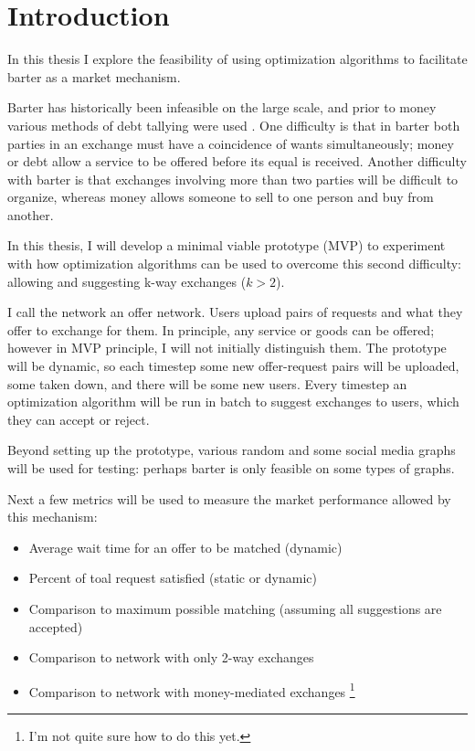\documentclass[main.tex]{subfiles}
\begin{document}
\section{Introduction}
In this thesis I explore the feasibility of using optimization algorithms to facilitate barter as a market mechanism.

Barter has historically been infeasible on the large scale, and prior to money various methods of debt tallying were used \cite{Gra1}. One difficulty is that in barter both parties in an exchange must have a coincidence of wants simultaneously; money or debt allow a service to be offered before its equal is received. Another difficulty with barter is that exchanges involving more than two parties will be difficult to organize, whereas money allows someone to sell to one person and buy from another.

In this thesis, I will develop a minimal viable prototype (MVP) to experiment with how optimization algorithms can be used to overcome this second difficulty: allowing and suggesting k-way exchanges ($k>2$).

I call the network an offer network. Users upload pairs of requests and what they offer to exchange for them. In principle, any service or goods can be offered; however in MVP principle, I will not initially distinguish them. The prototype will be dynamic, so each timestep some new offer-request pairs will be uploaded, some taken down, and there will be some new users. Every timestep an optimization algorithm will be run in batch to suggest exchanges to users, which they can accept or reject.

Beyond setting up the prototype, various random and some social media graphs will be used for testing: perhaps barter is only feasible on some types of graphs.

Next a few metrics will be used to measure the market performance allowed by this mechanism:
\begin{itemize}
  \item Average wait time for an offer to be matched (dynamic)
  \item Percent of toal request satisfied (static or dynamic)
  \item Comparison to maximum possible matching (assuming all suggestions are accepted)
  \item Comparison to network with only 2-way exchanges
  \item Comparison to network with money-mediated exchanges \footnote{I'm not quite sure how to do this yet.}
\end{itemize}
\end{document}
